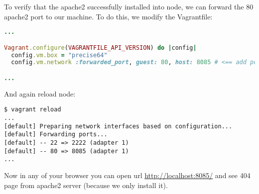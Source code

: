 To verify that the apache2 successfully installed into node, we can forward the 80 apache2 port to our machine. To do this, we modify the Vagrantfile:

\begin{lstlisting}[language=Ruby, label=lst:my-cloud-vagrant9,title=my-cloud/nodes/Vagrantfile]
...

Vagrant.configure(VAGRANTFILE_API_VERSION) do |config|
  config.vm.box = "precise64"
  config.vm.network :forwarded_port, guest: 80, host: 8085 # <== add port forwarding

...
\end{lstlisting}

And again reload node:

\begin{lstlisting}[label=lst:my-cloud-vagrant10]
$ vagrant reload
...
[default] Preparing network interfaces based on configuration...
[default] Forwarding ports...
[default] -- 22 => 2222 (adapter 1)
[default] -- 80 => 8085 (adapter 1)
...
\end{lstlisting}

Now in any of your browser you can open url \href{http://localhost:8085/}{http://localhost:8085/} and see 404 page from apache2 server (because we only install it).
